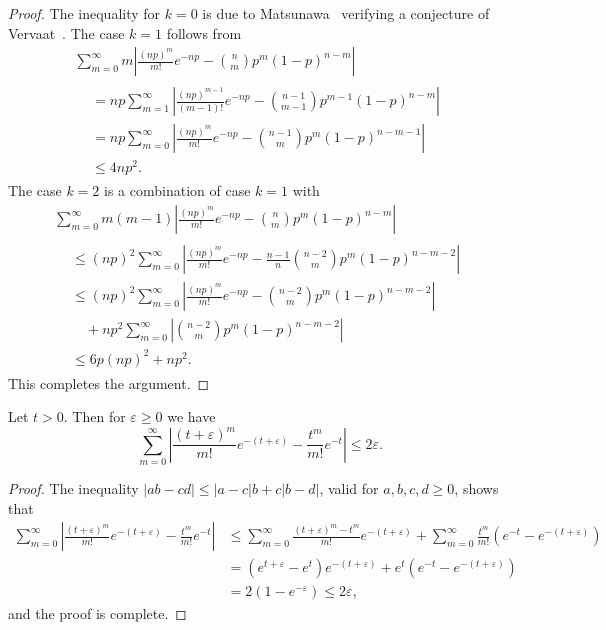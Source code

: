 \documentclass[AHL,Unicode,longabstracts,published]{cedram}
\begin{document}
\begin{proof}
The inequality for $k=0$ is due to Matsunawa~\cite{Matsunawa} verifying a conjecture of Vervaat~\cite{Vervaat}. The case $k=1$ follows from
\begin{multline*}
\sum_{m=0}^\infty m \left|\frac{(np)^m}{m!} e^{-np}- \binom{n}{m} p^m (1-p)^{n-m} \right|
\\
\begin{aligned}
&= np\sum_{m=1}^\infty \left|\frac{(np)^{m-1}}{(m-1)!} e^{-np} - \binom{n-1}{m-1} p^{m-1} (1-p)^{n-m} \right|
\\ & = np \sum_{m=0}^\infty \left|\frac{(np)^{m}}{m!} e^{-np} - \binom{n-1}{m} p^{m} (1-p)^{n-m-1} \right|
\\ &\leq 4np^2.
\end{aligned}
\end{multline*}
The case $k=2$ is a combination of case $k=1$ with
\begin{multline*}
\sum_{m=0}^\infty m(m-1) 
\left|\frac{(np)^m}{m!} e^{-np} - \binom{n}{m} p^m (1-p)^{n-m} \right|\\
\begin{aligned}
&\leq  (np)^2 \sum_{m=0}^\infty \left|\frac{(np)^{m}}{m!} e^{-np} - \frac{n-1}{n} \binom{n-2}{m} p^{m} (1-p)^{n-m-2} \right|
\\ &\leq  (np)^2 \sum_{m=0}^\infty \left|\frac{(np)^{m}}{m!} e^{-np} - \binom{n-2}{m} p^{m} (1-p)^{n-m-2} \right|
\\ & \quad+ np^2 \sum_{m=0}^\infty \left| \binom{n-2}{m} p^{m} (1-p)^{n-m-2} \right|
\\ &\leq  6 p (np)^2 + np^2.
\end{aligned}
\end{multline*}
This completes the argument.
\end{proof}


\begin{lemm}\label{le:diff-Poisson-Poisson}
Let $ t > 0 $. Then for $\varepsilon \geq 0$ we have
\begin{equation*}
\sum_{m=0}^\infty \left|\frac{(t+ \varepsilon) ^m}{m!} e^{-(t+ \varepsilon)} - \frac{t^m}{m!} e^{-t} \right| \leq 2 \varepsilon.
\end{equation*}
\end{lemm}


\begin{proof}
The inequality $|ab-cd| \leq |a-c|b + c |b -d| $, valid for $a,b,c,d\geq 0$, shows that
\begin{align*}
\sum_{m=0}^\infty \left|\frac{(t+ \varepsilon)^m}{m!} e^{-(t+ \varepsilon)} - \frac{t^m}{m!} e^{-t} \right| &\leq
\sum_{m=0}^\infty \frac{(t+ \varepsilon)^m-t^m}{m!} e^{- (t+ \varepsilon)} +
\sum_{m=0}^\infty \frac{t^m}{m!} \left(e^{- t} -e^{- (t+ \varepsilon)} \right)
\\ & =
\left(e^{t+ \varepsilon} - e^t \right) e^{- (t+ \varepsilon)} + e^t \left(e^{- t} -e^{- (t+ \varepsilon)} \right)
\\ & = 2(1 - e^{-\varepsilon}) \leq 2 \varepsilon,
\end{align*}
and the proof is complete.
\end{proof}
\end{document}
